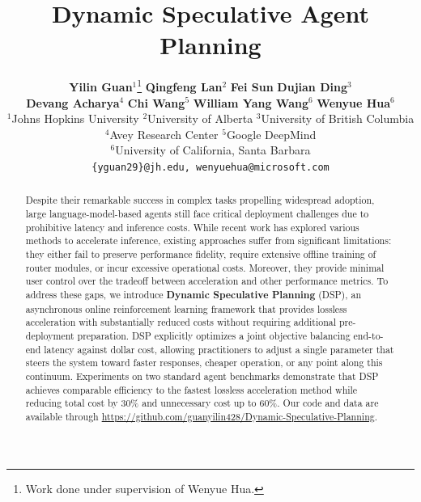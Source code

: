 \documentclass{article}
\title{Dynamic Speculative Agent Planning}
\author{%
  \textbf{Yilin Guan}$^1$\thanks{Work done under supervision of Wenyue Hua.} \quad
  \textbf{Qingfeng Lan}$^2$ \quad
  \textbf{Fei Sun} \quad
  \textbf{Dujian Ding}$^3$ \quad \\
  \vspace{-0.8em}
  \textbf{Devang Acharya}$^4$\quad
  \textbf{Chi Wang}$^5$ \quad
  \textbf{William Yang Wang}$^6$ \quad
  \textbf{Wenyue Hua}$^6$ \quad \\
  \vspace{0.4em}
  $^1$Johns Hopkins University \quad
  $^2$University of Alberta \quad 
  $^3$University of British Columbia \quad \\
  $^4$Avey Research Center \quad 
  $^5$Google DeepMind \quad \\
  $^6$University of California, Santa Barbara \\
  
  \texttt{\{yguan29\}@jh.edu, wenyuehua@microsoft.com}
}
\theoremstyle{definition}
\begin{document}
\maketitle



\begin{abstract}
Despite their remarkable success in complex tasks propelling widespread adoption, large language-model-based agents still face critical deployment challenges due to prohibitive latency and inference costs. While recent work has explored various methods to accelerate inference, existing approaches suffer from significant limitations: they either fail to preserve performance fidelity, require extensive offline training of router modules, or incur excessive operational costs. Moreover, they provide minimal user control over the tradeoff between acceleration and other performance metrics.
To address these gaps, we introduce \textbf{Dynamic Speculative Planning} (DSP), an asynchronous online reinforcement learning framework that provides lossless acceleration with substantially reduced costs without requiring additional pre-deployment preparation. DSP explicitly optimizes a joint objective balancing end-to-end latency against dollar cost, allowing practitioners to adjust a single parameter that steers the system toward faster responses, cheaper operation, or any point along this continuum.
Experiments on two standard agent benchmarks demonstrate that DSP achieves comparable efficiency to the fastest lossless acceleration method while reducing total cost by 30\% and unnecessary cost up to 60\%. Our code and data are available through \url{https://github.com/guanyilin428/Dynamic-Speculative-Planning}.

\end{abstract}













% 
\end{document}
